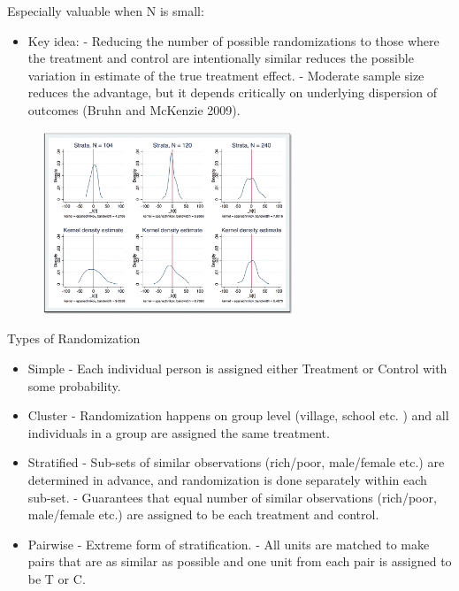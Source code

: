 \documentclass[aspectratio=169]{beamer}
\begin{document}
\begin{frame}[fragile]{Especially valuable when N is small:}
\begin{multicols}{2}	
	
	\begin{itemize}[<default overlay specification>]	
		\item<1>  Key idea:
		\newline - Reducing the number of possible randomizations to those where the treatment and control are intentionally similar reduces the possible variation in estimate of the true treatment effect.
		\newline - Moderate sample size reduces the advantage, but it depends critically on underlying dispersion of outcomes (Bruhn and McKenzie 2009).
	\end{itemize}
	
	\begin{figure}
		\centering
		\includegraphics[width=75mm]{img/Small_N}
	\end{figure}
	
\end{multicols}
\end{frame}


\begin{frame}{Types of Randomization}

\begin{itemize}[<default overlay specification>]
	\item<1> Simple
		\newline - Each individual person is assigned either Treatment or Control with some probability.
	\item<1> Cluster
		\newline - Randomization happens on group level (village, school etc. ) and all individuals in a group are assigned the same treatment. 
	\item<1> Stratified
		\newline - Sub-sets of similar observations (rich/poor, male/female etc.) are determined in advance, and randomization is done separately within each sub-set. 
		\newline - Guarantees that equal number of similar observations (rich/poor, male/female etc.) are assigned to be each treatment and control.
	\item<1> Pairwise
		\newline - Extreme form of stratification. 
		\newline - All units are matched to make pairs that are as similar as possible and one unit from each pair is assigned to be T or C.
\end{itemize}

\end{frame}
\end{document}
